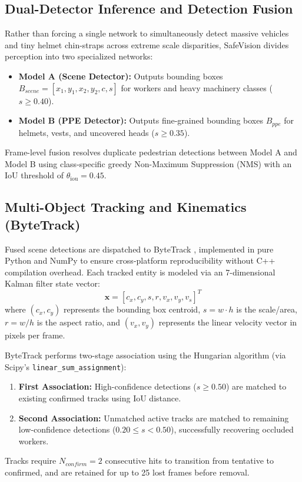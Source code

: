 \documentclass[letterpaper, 10 pt, conference]{ieeeconf}
\begin{document}
\subsection{Dual-Detector Inference and Detection Fusion}
Rather than forcing a single network to simultaneously detect massive vehicles and tiny helmet chin-straps across extreme scale disparities, SafeVision divides perception into two specialized networks:
\begin{itemize}
    \item \textbf{Model A (Scene Detector):} Outputs bounding boxes $B_{scene} = [x_1, y_1, x_2, y_2, c, s]$ for workers and heavy machinery classes ($s \ge 0.40$).
    \item \textbf{Model B (PPE Detector):} Outputs fine-grained bounding boxes $B_{ppe}$ for helmets, vests, and uncovered heads ($s \ge 0.35$).
\end{itemize}
Frame-level fusion resolves duplicate pedestrian detections between Model A and Model B using class-specific greedy Non-Maximum Suppression (NMS) with an IoU threshold of $\theta_{\text{iou}} = 0.45$.

\subsection{Multi-Object Tracking and Kinematics (ByteTrack)}
Fused scene detections are dispatched to ByteTrack \cite{zhang2022bytetrack}, implemented in pure Python and NumPy to ensure cross-platform reproducibility without C++ compilation overhead. Each tracked entity is modeled via an 7-dimensional Kalman filter state vector:
\begin{equation}
\mathbf{x} = [c_x, c_y, s, r, v_x, v_y, v_s]^T
\end{equation}
where $(c_x, c_y)$ represents the bounding box centroid, $s = w \cdot h$ is the scale/area, $r = w/h$ is the aspect ratio, and $(v_x, v_y)$ represents the linear velocity vector in pixels per frame.

ByteTrack performs two-stage association using the Hungarian algorithm (via Scipy's \texttt{linear\_sum\_assignment}):
\begin{enumerate}
    \item \textbf{First Association:} High-confidence detections ($s \ge 0.50$) are matched to existing confirmed tracks using IoU distance.
    \item \textbf{Second Association:} Unmatched active tracks are matched to remaining low-confidence detections ($0.20 \le s < 0.50$), successfully recovering occluded workers.
\end{enumerate}
Tracks require $N_{confirm} = 2$ consecutive hits to transition from tentative to confirmed, and are retained for up to 25 lost frames before removal.
\end{document}
